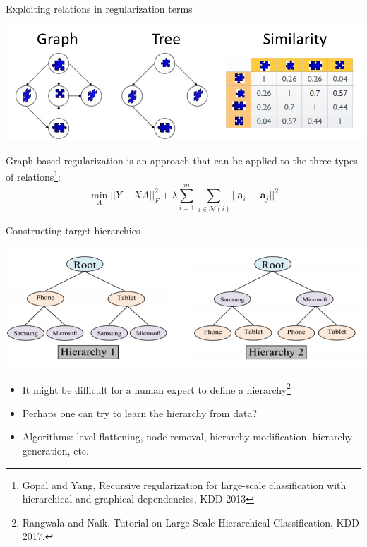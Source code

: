 \documentclass[]{beamer}
\renewcommand{\vec}[1]{\boldsymbol{#1}}
\begin{document}
\begin{frame}{Exploiting relations in regularization terms}

\begin{center}
\includegraphics[width=\textwidth]{pics/targetrelations}
\end{center} \pause 

Graph-based regularization is an approach that can be applied to the three types of relations\footnote{Gopal and Yang, Recursive regularization for large-scale classification with hierarchical
and graphical dependencies, KDD 2013}: 
\begin{equation*}
\min_A ||Y - XA ||^2_F + \lambda \sum_{i=1}^m \sum_{j \in \mathcal{N}(i)} ||\vec{a}_i - \ \vec{a}_j||^2 
\end{equation*}

\end{frame}




\begin{frame}{Constructing target hierarchies}

\includegraphics[width=\textwidth]{pics/hierarchies}

\begin{itemize}
\item It might be difficult for a human expert to define a hierarchy\footnote{Rangwala and Naik, Tutorial on Large-Scale Hierarchical Classification, KDD 2017.}
\item Perhaps one can try to learn the hierarchy from data? 
\item Algorithms: level flattening, node removal, hierarchy modification, hierarchy generation, etc.
\end{itemize}


\end{frame}
\end{document}
